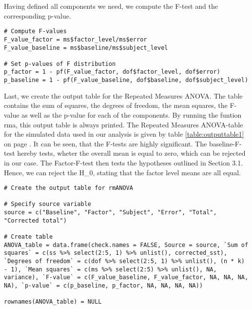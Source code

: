 \documentclass[11pt]{article}
\begin{document}
					Having defined all components we need, we compute the F-test and the corresponding p-value.\\
							
\begin{lstlisting}   
# Compute F-values 
F_value_factor = ms$factor_level/ms$error
F_value_baseline = ms$baseline/ms$subject_level

# Set p-values of F distribution 
p_factor = 1 - pf(F_value_factor, dof$factor_level, dof$error)
p_baseline = 1 - pf(F_value_baseline, dof$baseline, dof$subject_level)
\end{lstlisting}   

					Last, we create the output table for the Repeated Measures ANOVA. The table contains the sum of squares, the degrees of freedom, the mean squares, the F-value as well as the p-value for each of the components. By running the funtion rma, this output table is always printed. The Repeated Measures ANOVA-table for the simulated data used in our analysis is given by table \ref{table:outputtable1} on page \pageref{table:outputtable1}. It can be seen, that the F-tests are highly significant. The baseline-F-test hereby tests, wheter the overall mean is equal to zero, which can be rejected in our case. The Factor-F-test then tests the hypotheses outlined in Section 3.1. Hence, we can reject the H_{0}, stating that the factor level means are all equal.\\
		
\begin{lstlisting}   
# Create the output table for rmANOVA

# Specify source variable
source = c("Baseline", "Factor", "Subject", "Error", "Total", "Corrected total")
    
# Create table
ANOVA_table = data.frame(check.names = FALSE, Source = source, `Sum of squares` = c(ss %>% select(2:5, 1) %>% unlist(), corrected_sst), `Degrees of freedom` = c(dof %>% select(2:5, 1) %>% unlist(), (n * k) - 1), `Mean squares` = c(ms %>% select(2:5) %>% unlist(), NA, variance), `F-value` = c(F_value_baseline, F_value_factor, NA, NA, NA, NA), `p-value` = c(p_baseline, p_factor, NA, NA, NA, NA))

rownames(ANOVA_table) = NULL
\end{lstlisting}   
\end{document}
